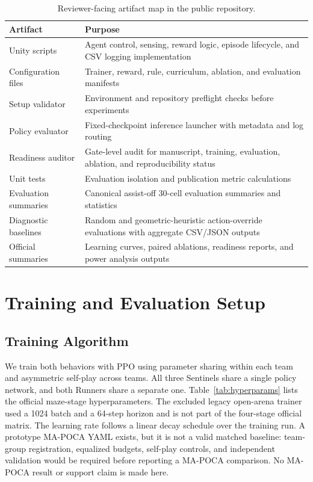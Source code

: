 \documentclass[journal]{IEEEtran}
\begin{document}
\begin{table}[t]
\centering
\caption{Reviewer-facing artifact map in the public repository.}
\label{tab:artifact_map}
\scriptsize
\setlength{\tabcolsep}{3pt}
\begin{tabular}{p{2.7cm}p{4.4cm}}
\toprule
Artifact & Purpose \\
\midrule
Unity scripts & Agent control, sensing, reward logic, episode lifecycle, and CSV logging implementation \\
Configuration files & Trainer, reward, rule, curriculum, ablation, and evaluation manifests \\
Setup validator & Environment and repository preflight checks before experiments \\
Policy evaluator & Fixed-checkpoint inference launcher with metadata and log routing \\
Readiness auditor & Gate-level audit for manuscript, training, evaluation, ablation, and reproducibility status \\
Unit tests & Evaluation isolation and publication metric calculations \\
Evaluation summaries & Canonical assist-off 30-cell evaluation summaries and statistics \\
Diagnostic baselines & Random and geometric-heuristic action-override evaluations with aggregate CSV/JSON outputs \\
Official summaries & Learning curves, paired ablations, readiness reports, and power analysis outputs \\
\bottomrule
\end{tabular}
\end{table}

\section{Training and Evaluation Setup}

\subsection{Training Algorithm}

We train both behaviors with PPO using parameter sharing within each team and asymmetric self-play across teams. All three Sentinels share a single policy network, and both Runners share a separate one. Table~\ref{tab:hyperparams} lists the official maze-stage hyperparameters. The excluded legacy open-arena trainer used a 1024 batch and a 64-step horizon and is not part of the four-stage official matrix. The learning rate follows a linear decay schedule over the training run. A prototype MA-POCA YAML exists, but it is not a valid matched baseline: team-group registration, equalized budgets, self-play controls, and independent validation would be required before reporting a MA-POCA comparison. No MA-POCA result or support claim is made here.
\end{document}
